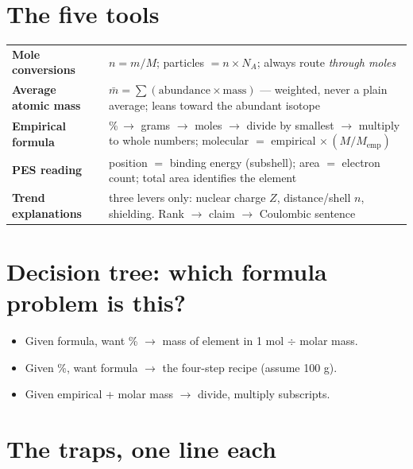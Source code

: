 \documentclass{apchem-worksheet}
\begin{document}
\apctitleblock

\section*{\sffamily The five tools}

\renewcommand{\arraystretch}{1.5}
\noindent\begin{tabular}{@{}p{4.1cm}p{9.6cm}@{}}
\toprule
\textbf{Mole conversions} & $n = m/M$; \quad particles $= n \times N_A$;
  \quad always route \emph{through moles}\\
\textbf{Average atomic mass} & $\bar m = \sum(\text{abundance}\times\text{mass})$
  --- weighted, never a plain average; leans toward the abundant isotope\\
\textbf{Empirical formula} & \%\,$\to$ grams $\to$ moles $\to$ divide by
  smallest $\to$ multiply to whole numbers; molecular $= $ empirical
  $\times\, (M/M_{\text{emp}})$\\
\textbf{PES reading} & position $=$ binding energy (subshell); area $=$
  electron count; total area identifies the element\\
\textbf{Trend explanations} & three levers only: nuclear charge $Z$,
  distance/shell $n$, shielding. Rank $\to$ claim $\to$ Coulombic sentence\\
\bottomrule
\end{tabular}

\section*{\sffamily Decision tree: which formula problem is this?}

\begin{itemize}[leftmargin=*,itemsep=0.2em]
  \item Given formula, want \% $\to$ mass of element in 1 mol $\div$ molar
        mass.
  \item Given \%, want formula $\to$ the four-step recipe (assume 100 g).
  \item Given empirical + molar mass $\to$ divide, multiply subscripts.
\end{itemize}

\section*{\sffamily The traps, one line each}
\end{document}
